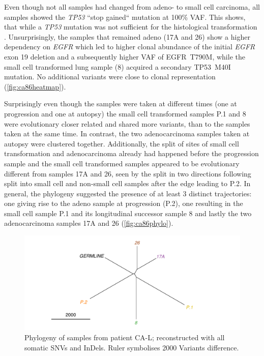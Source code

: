 Even though not all samples had changed from adeno- to small cell carcinoma, all samples showed the \textit{TP53} ``stop gained`` mutation at 100\% VAF. This shows, that while a \textit{TP53} mutation was not sufficient for the histological transformation \cite{Offin2019}. Unsurprisingly, the samples that remained adeno (17A and 26) show a higher dependency on \textit{EGFR} which led to higher clonal abundance of the initial \textit{EGFR} exon 19 deletion and a subsequently higher VAF of EGFR~T790M, while the small cell transformed lung sample (8) acquired a secondary TP53~M40I mutation. No additional variants were close to clonal representation (\autoref{fig:ca86heatmap}).

Surprisingly even though the samples were taken at different times (one at progression and one at autopsy) the small cell transformed samples P.1 and 8 were evolutionary closer related and shared more variants, than to the samples taken at the same time. In contrast, the two adenocarcinoma samples taken at autopsy were clustered together. Additionally, the split of sites of small cell transformation and adenocarcinoma  already had happened before the progression sample and the small cell transformed samples appeared to be evolutionary different from samples 17A and 26, seen by the split in two directions following split into small cell and non-small cell samples after the edge leading to P.2. In general, the phylogeny suggested the presence of at least 3 distinct trajectories: one giving rise to the adeno sample at progression (P.2), one resulting in the small cell sample P.1 and its longitudinal successor sample 8 and lastly the two adenocarcinoma samples 17A and 26 (\autoref{fig:ca86phylo}).

\begin{figure}[ht]
	\centering
	\includegraphics[width=.99\linewidth]{Figures/CASCADE/CA86/CA86phylo.pdf}
	\caption[Phylogeny of autopsy samples from patient CA-L]{Phylogeny of samples from patient CA-L; reconstructed with all somatic SNVs and InDels. Ruler symbolises 2000 Variants difference.} \label{fig:ca86phylo}
\end{figure}



